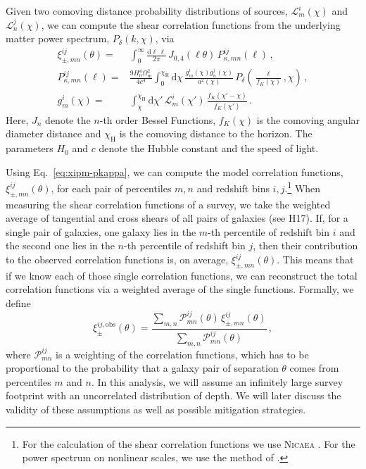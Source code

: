\documentclass{aa}
\renewcommand{\rm}{\mathrm}
\begin{document}
Given two comoving distance probability distributions of sources, $\mathcal{L}^i_m(\chi)$ and $\mathcal{L}^j_n(\chi)$, we can compute the shear correlation functions from the underlying matter power spectrum, $P_\delta(k,\chi)$, via \citep{1992ApJ...388..272K} \begin{align}
\label{eq:xipm-pkappa}
\xi_{\pm,mn}^{ij}(\theta) =& \int_0^\infty \frac{{\rm d}\ell\,\ell}{2\pi}\, J_{0,4}(\ell\theta)\, P^{ij}_{\kappa,mn}(\ell)\, , \\
\label{eq:pkappa-pdelta/lenseff}
P^{ij}_{\kappa,mn}(\ell) =& \frac{9 H_0^4\Omega_{\rm m}^2}{4c^4}\int_0^{\chi_{\rm{H}}} {\rm d}\chi\, \frac{g^i_m(\chi)g^j_n(\chi)}{a^2(\chi)}\, P_\delta\left(\frac{\ell}{f_K(\chi)},\chi\right)\, , \\
\label{eq:lenseff}
g^i_m(\chi) =& \int_\chi^{\chi_{\rm{H}}} {\rm d}\chi' \, \mathcal{L}^i_m(\chi') \, \frac{f_K(\chi'-\chi)}{f_K(\chi')}\, .
\end{align}
Here, $J_n$ denote the $n$-th order Bessel Functions, $f_K(\chi)$ is the comoving angular diameter distance and $\chi_{\rm{H}}$ is the comoving distance to the horizon. The parameters $H_0$ and $c$ denote the Hubble constant and the speed of light.

Using Eq.~\eqref{eq:xipm-pkappa}, we can compute the model correlation functions, $\xi_{\pm,mn}^{ij}(\theta)$, for each pair of percentiles $m,n$ and redshift bins $i,j$.\footnote{For the calculation of the shear correlation functions we use \textsc{Nicaea} \citep{2009A&A...497..677K}. %
For the power spectrum on nonlinear scales, we use the method of \citet{2012ApJ...761..152T}.} When measuring the shear correlation functions of a survey, we take the weighted average of tangential and cross shears of all pairs of galaxies (see H17). If, for a single pair of galaxies, one galaxy lies in the $m$-th percentile of redshift bin $i$ and the second one lies in the $n$-th percentile of redshift bin $j$, then their contribution to the observed correlation functions is, on average, $\xi_{\pm,mn}^{ij}(\theta)$. This means that if we know each of those single correlation functions, we can reconstruct the total correlation functions via a weighted average of the single functions. Formally, we define \begin{equation}
\xi_\pm^{ij,\rm{obs}}(\theta) = \frac{\sum_{m,n} \mathcal{P}_{mn}^{ij}(\theta)\,\xi_{\pm,mn}^{ij}(\theta)}{\sum_{m,n} \mathcal{P}_{mn}^{ij}(\theta)}\, ,
\label{eq:def_xiobs}
\end{equation}
where $\mathcal{P}_{mn}^{ij}$ is a weighting of the correlation functions, which has to be proportional to the probability that a galaxy pair of separation $\theta$ comes from percentiles $m$ and $n$. In this analysis, we will assume an infinitely large survey footprint with an uncorrelated distribution of depth. We will later discuss the validity of these assumptions as well as possible mitigation strategies. 
\end{document}

